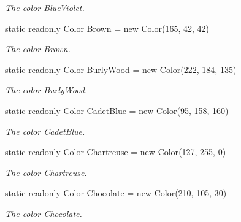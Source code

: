 \begin{DoxyCompactItemize}
\begin{DoxyCompactList}\small\item\em The color Blue\-Violet. \end{DoxyCompactList}\item 
static readonly \hyperlink{struct_tri_devs_1_1_tri_engine_1_1_color}{Color} \hyperlink{struct_tri_devs_1_1_tri_engine_1_1_color_aaa1555f3b522de595ea9e72e52e36e7e}{Brown} = new \hyperlink{struct_tri_devs_1_1_tri_engine_1_1_color}{Color}(165, 42, 42)
\begin{DoxyCompactList}\small\item\em The color Brown. \end{DoxyCompactList}\item 
static readonly \hyperlink{struct_tri_devs_1_1_tri_engine_1_1_color}{Color} \hyperlink{struct_tri_devs_1_1_tri_engine_1_1_color_a62a87f7891a89e57c0767036e329ee8e}{Burly\-Wood} = new \hyperlink{struct_tri_devs_1_1_tri_engine_1_1_color}{Color}(222, 184, 135)
\begin{DoxyCompactList}\small\item\em The color Burly\-Wood. \end{DoxyCompactList}\item 
static readonly \hyperlink{struct_tri_devs_1_1_tri_engine_1_1_color}{Color} \hyperlink{struct_tri_devs_1_1_tri_engine_1_1_color_ad02139884481a691ab9aeb5dbe785183}{Cadet\-Blue} = new \hyperlink{struct_tri_devs_1_1_tri_engine_1_1_color}{Color}(95, 158, 160)
\begin{DoxyCompactList}\small\item\em The color Cadet\-Blue. \end{DoxyCompactList}\item 
static readonly \hyperlink{struct_tri_devs_1_1_tri_engine_1_1_color}{Color} \hyperlink{struct_tri_devs_1_1_tri_engine_1_1_color_ad93b0b8683b7c8ac73619c095aee63d4}{Chartreuse} = new \hyperlink{struct_tri_devs_1_1_tri_engine_1_1_color}{Color}(127, 255, 0)
\begin{DoxyCompactList}\small\item\em The color Chartreuse. \end{DoxyCompactList}\item 
static readonly \hyperlink{struct_tri_devs_1_1_tri_engine_1_1_color}{Color} \hyperlink{struct_tri_devs_1_1_tri_engine_1_1_color_aa8052b86fd2d5541c792273b6ad18fe2}{Chocolate} = new \hyperlink{struct_tri_devs_1_1_tri_engine_1_1_color}{Color}(210, 105, 30)
\begin{DoxyCompactList}\small\item\em The color Chocolate. \end{DoxyCompactList}\item 

\end{DoxyCompactItemize}
